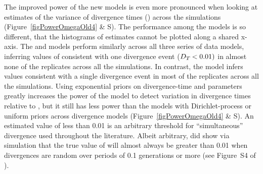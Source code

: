 The improved power of the new models is even more pronounced when looking at
estimates of the variance of divergence times (\divTimeDispersion) across the
simulations
(Figure~\ref{figPowerOmegaOld4} \& 
S).
The performance among the models is so different, that the histograms of
\divTimeDispersion estimates cannot be plotted along a shared x-axis.
The \modelDPP and \modelUniform models perform similarly across all three
series of data models, inferring values of \divTimeDispersion consistent with
one divergence event ($D_{T_{}} < 0.01)$ in almost none of the
replicates across all the simulations.
In contrast, the \modelOld model infers values consistent with a single
divergence event in most of the replicates across all the simulations.
Using exponential priors on divergence-time and \myTheta{} parameters greatly
increases the power of the \modelUshaped model to detect variation in
divergence times relative to \modelOld, but it still has less power than the
models with Dirichlet-process or uniform priors across divergence models 
(Figure~\ref{figPowerOmegaOld4} \& 
S).
An estimated value of \divTimeDispersion less than 0.01 is an arbitrary
threshold for ``simultaneous'' divergence used throughout the \msb
literature.
Albeit arbitrary, \cite{Oaks2012} did show via simulation that the true value
of \divTimeDispersion will almost always be greater than 0.01 when divergences
are random over periods of 0.1 \globalcoalunit generations or more (see
Figure~S4 of \citet{Oaks2012}).

